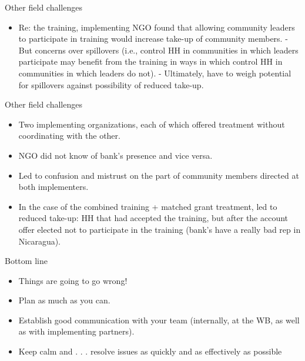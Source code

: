 \documentclass[aspectratio=169]{beamer}
\begin{document}
\begin{frame}{Other field challenges}

\begin{itemize}[<default overlay specification>]
	\item<1>   Re: the training, implementing NGO found that allowing community leaders to participate in training would increase take-up of community members.
		\newline -  But concerns over spillovers (i.e., control HH in communities in which leaders participate may benefit from the training in ways in which control HH in communities in which leaders do not).
		\newline - Ultimately, have to weigh potential for spillovers against possibility of reduced take-up.
\end{itemize}

\end{frame}

\begin{frame}{Other field challenges}

\begin{itemize}[<default overlay specification>]
	\item<1>   Two implementing organizations, each of which offered treatment without coordinating with the other.
	\item<1>  NGO did not know of bank’s presence and vice versa.
	\item<1> Led to confusion and mistrust on the part of community members directed at both implementers.
	\item<1> In the case of the combined training + matched grant treatment, led to reduced take-up: HH that had accepted the training, but after the account offer elected not to participate in the training (bank’s have a really bad rep in Nicaragua).
\end{itemize}

\end{frame}

\begin{frame}{Bottom line}

\begin{itemize}[<default overlay specification>]
	\item<1>  Things are going to go wrong!
	\item<1>  Plan as much as you can.
	\item<1> Establish good communication with your team (internally, at the WB, as well as with implementing partners).
	\item<1> Keep calm and . . . resolve issues as quickly and as effectively as possible
\end{itemize}

\end{frame}
\end{document}

